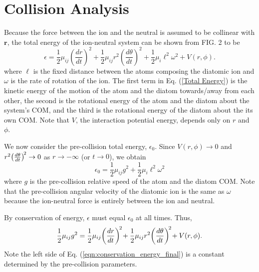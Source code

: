 \documentclass[article]{revtex4-2}
\begin{document}
\section{Collision Analysis}
Because the force between the ion and the neutral is assumed to be collinear with $\mathbf{r}$, the total energy of the ion-neutral system can be shown from FIG. 2 to be
 \begin{equation}
    \epsilon = \frac{1}{2}\mu_{ij}\left(\frac{dr}{dt}\right)^2 + \frac{1}{2}\mu_{ij}r^2\left(\frac{d\theta}{dt}\right)^2 + \frac{1}{2} \mu_i \ell^2 \omega^2 + V(r, \phi).
    \label{Total Energy}
\end{equation}
 where $\ell$ is the fixed distance between the atoms composing the diatomic ion and $\omega$ is the rate of rotation of the ion. The first term in Eq. (\ref{Total Energy}) is the kinetic energy of the motion of the atom and the diatom towards/away from each other, the second is the rotational energy of the atom and the diatom about the system's COM, and the third is the rotational energy of the diatom about the its own COM. Note that $V$, the interaction potential energy, depends only on $r$ and $\phi$.

We now consider the pre-collision total energy, $\epsilon_{0}$. Since $V(r, \phi)\rightarrow 0$ and $r^2\mkern-3mu\left(\frac{d\theta}{dt}\right)^{\mkern-3mu 2} \rightarrow 0$ as $r\rightarrow - \infty $ (or $t\rightarrow 0$), we obtain
\begin{equation}
    \epsilon_{0} = \frac{1}{2}\mu_{ij}g^2 + \frac{1}{2} \mu_{i} \ell^2 \omega^2
    \label{eqn:pre_collision_energy}
\end{equation}
where $g$ is the pre-collision relative speed of the atom and the diatom COM.  Note that the pre-collision angular velocity of the diatomic ion is the same as $\omega$ because the ion-neutral force is entirely between the ion and neutral.

By conservation of energy, $\epsilon$ must equal $\epsilon_{0}$ at all times. Thus,
\begin{equation}
   \frac{1}{2}\mu_{ij}g^2  = \frac{1}{2}\mu_{ij}\mkern-3mu\left(\frac{dr}{dt}\right)^{\mkern-3mu 2} \mkern-3mu + \frac{1}{2}\mu_{ij}r^2\mkern-3mu\left(\frac{d\theta}{dt}\right)^{\mkern-3mu 2} \mkern-3mu + V(r, \phi).
   \label{eqn:conservation_energy_final}
\end{equation}
Note the left side of Eq. (\ref{eqn:conservation_energy_final}) is a constant determined by the pre-collision parameters.
\end{document}

